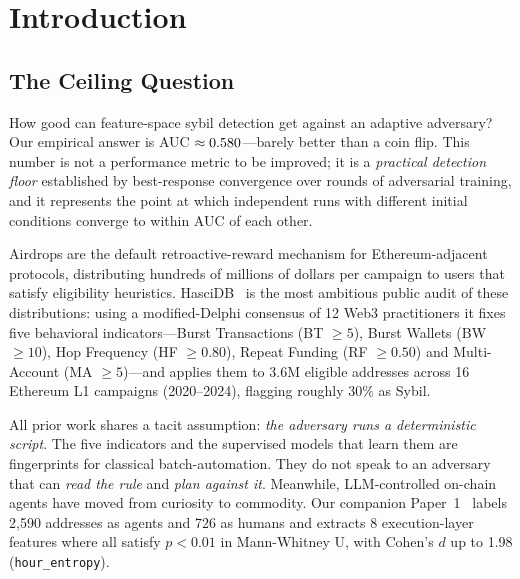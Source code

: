 \documentclass[sigconf,nonacm=false]{acmart}
\begin{document}
\maketitle


\section{Introduction}
\label{sec:intro}

\subsection{The Ceiling Question}

How good can feature-space sybil detection get against an adaptive adversary? Our empirical answer is AUC $\approx 0.580{}$---barely better than a coin flip. This number is not a performance metric to be improved; it is a \emph{practical detection floor} established by best-response convergence over \bestResponseNRounds{} rounds of adversarial training, and it represents the point at which \bestResponseNSeeds{} independent runs with different initial conditions converge to within \bestResponseAucFloorStd{} AUC of each other.

Airdrops are the default retroactive-reward mechanism for Ethereum-adjacent protocols, distributing hundreds of millions of dollars per campaign to users that satisfy eligibility heuristics. HasciDB~\cite{hascidb2026} is the most ambitious public audit of these distributions: using a modified-Delphi consensus of 12 Web3 practitioners it fixes five behavioral indicators---Burst Transactions (BT $\ge 5$), Burst Wallets (BW $\ge 10$), Hop Frequency (HF $\ge 0.80$), Repeat Funding (RF $\ge 0.50$) and Multi-Account (MA $\ge 5$)---and applies them to 3.6M eligible addresses across 16 Ethereum L1 campaigns (2020--2024), flagging roughly 30\% as Sybil.

All prior work shares a tacit assumption: \textit{the adversary runs a deterministic script}. The five indicators and the supervised models that learn them are fingerprints for classical batch-automation. They do not speak to an adversary that can \textit{read the rule} and \textit{plan against it}. Meanwhile, LLM-controlled on-chain agents have moved from curiosity to commodity. Our companion Paper~1~\cite{wen2026agent} labels 2,590 addresses as agents and 726 as humans and extracts 8 execution-layer features where all satisfy $p{<}0.01$ in Mann-Whitney U, with Cohen's $d$ up to 1.98 (\texttt{hour\_entropy}).
\end{document}
